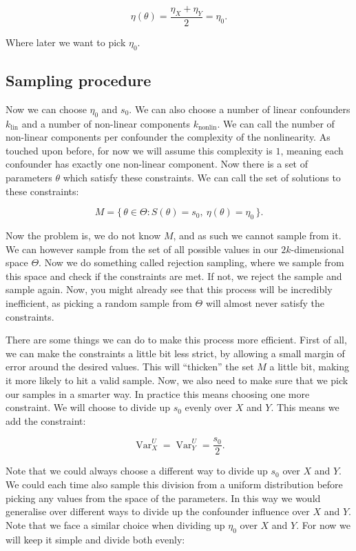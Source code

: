\documentclass{article}
\begin{document}
\[
\eta(\theta) = \frac{\eta_X + \eta_Y}{2} = \eta_0.
\]

\noindent
Where later we want to pick $\eta_0$.

\subsection*{Sampling procedure}
Now we can choose $\eta_0$ and $s_0$. We can also choose a number of linear confounders $k_{\text{lin}}$ and a number of 
non-linear components $k_{\text{nonlin}}$. We can call the number of non-linear components per confounder the complexity of the nonlinearity. 
As touched upon before, for now we will assume this complexity is $1$, meaning each confounder has exactly one non-linear component. Now
there is a set of parameters $\theta$ which satisfy these constraints. We can call the set of solutions to these constraints:

\[
M = \{\, \theta \in \Theta : S(\theta) = s_0,\ \eta(\theta) = \eta_0 \,\}.
\]

\noindent
Now the problem is, we do not know $M$, and as such we cannot sample from it. We can however sample from the set of all possible values in
our $2k$-dimensional space $\Theta$. Now we do something called rejection sampling, where we sample from this space and check if the 
constraints are met. If not, we reject the sample and sample again. Now, you might already see that this process will be incredibly inefficient,
as picking a random sample from $\Theta$ will almost never satisfy the constraints. 

There are some things we can do to make this process more efficient.
First of all, we can make the constraints a little bit less strict, by allowing a small margin of error around the desired values. This will ``thicken''
the set $M$ a little bit, making it more likely to hit a valid sample. Now, we also need to make sure that we pick our samples in a smarter way. In
practice this means choosing one more constraint. We will choose to divide up $s_0$ evenly over $X$ and $Y$. This means we add the constraint:

\[
\operatorname{Var}_X^U = \operatorname{Var}_Y^U = \frac{s_0}{2}.
\]

\noindent
Note that we could always choose a different way to divide up $s_0$ over $X$ and $Y$. We could each time also sample this division from a uniform distribution
before picking any values from the space of the parameters. In this way we would generalise over different ways to divide up the confounder influence 
over $X$ and $Y$. Note that we face a similar choice when dividing up $\eta_0$ over $X$ and $Y$. For now we will keep it simple and divide both evenly:
\end{document}
